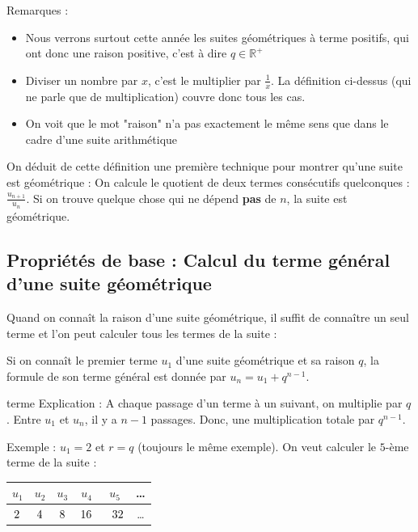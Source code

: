 \documentclass[10pt,a4paper]{book}
\begin{document}
Remarques :
\begin{itemize}
    \item Nous verrons surtout cette année les suites géométriques à terme positifs, qui ont donc une raison positive, c'est à dire $q \in \mathbb{R}^+$
    \item Diviser un nombre par $x$, c'est le multiplier par $\frac{1}{x}$. La définition ci-dessus (qui ne parle que de multiplication) couvre donc tous les cas.
    \item On voit que le mot "raison" n'a pas exactement le même sens que dans le cadre d'une suite arithmétique
\end{itemize}

On déduit de cette définition une première technique pour montrer qu'une suite est géométrique : On calcule le quotient de deux termes consécutifs quelconques : $\frac{u_{n+1}}{u_n}$. Si on trouve quelque chose qui ne dépend \textbf{pas} de $n$, la suite est géométrique.



\subsection{Propriétés de base : Calcul du terme général d'une suite géométrique}

Quand on connaît la raison d'une suite géométrique, il suffit de connaître un seul terme et l'on peut calculer tous les termes de la suite :

\begin{prop}

Si on connaît le premier terme $u_1$ d'une suite géométrique et sa raison $q$, la formule de son terme général est donnée par $u_n=u_1+q^{n-1}$.
\end{prop}
terme
Explication : A chaque passage d'un terme à un suivant, on multiplie par $q$. Entre $u_1$ et $u_n$, il y a $n-1$ passages. Donc, une multiplication totale par $q^{n-1}$.

Exemple : $u_1=2$ et $r=q$ (toujours le même exemple). On veut calculer le $5$-ème terme de la suite :

{
\centering
    \begin{tabular}{|c|c|c|c|c|c|}
        \hline
        $u_1$ & $u_2$ & $u_3$ & $u_4$  & $u_5$ & \ldots \\
        \hline
         $2\insertph{n1}$ & $\insertph{n2}4\insertph{n3}$ & $\insertph{n4}8\insertph{n5}$ & $\insertph{n6}16\insertph{n7}$ &  \ $\insertph{n8}32$  & \ldots \\ 
        \hline
    \end{tabular}\par
}
\end{document}
